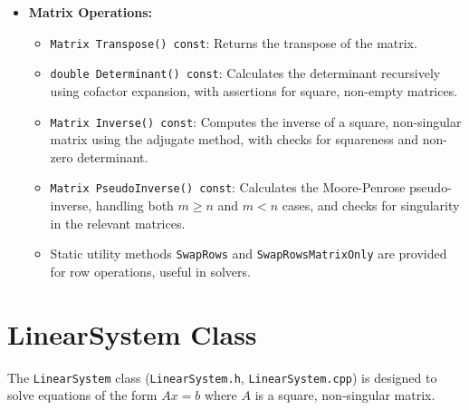 \begin{itemize}
    \item \textbf{Matrix Operations:}
        \begin{itemize}
            \item \texttt{Matrix Transpose() const}: Returns the transpose of the matrix.
            \item \texttt{double Determinant() const}: Calculates the determinant recursively using cofactor expansion, with assertions for square, non-empty matrices.
            \item \texttt{Matrix Inverse() const}: Computes the inverse of a square, non-singular matrix using the adjugate method, with checks for squareness and non-zero determinant.
            \item \texttt{Matrix PseudoInverse() const}: Calculates the Moore-Penrose pseudo-inverse, handling both $m \ge n$ and $m < n$ cases, and checks for singularity in the relevant matrices.
            \item Static utility methods \texttt{SwapRows} and \texttt{SwapRowsMatrixOnly} are provided for row operations, useful in solvers.
        \end{itemize}
\end{itemize}

\section{LinearSystem Class}
\label{sec:linearsystem_class}

The \texttt{LinearSystem} class (\texttt{LinearSystem.h}, \texttt{LinearSystem.cpp}) is designed to solve equations of the form $Ax=b$ where $A$ is a square, non-singular matrix.

\begin{figure}[H]

\end{figure}

